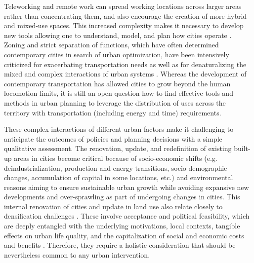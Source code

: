 Teleworking and remote work can spread working locations across larger areas rather than concentrating them, and also encourage the creation of more hybrid and mixed-use spaces. This increased complexity makes it necessary to develop new tools allowing one to understand, model, and plan how cities operate \citep{Camocini2011TeleworkingWorkplace}. Zoning and strict separation of functions, which have often determined contemporary cities in search of urban optimization, have been intensively criticized for exacerbating transportation needs as well as for denaturalizing the mixed and complex interactions of urban systems \citep{Jacobs1961}. Whereas the development of contemporary transportation has allowed cities to grow beyond the human locomotion limits, it is still an open question how to find effective tools and methods in urban planning to leverage the distribution of uses across the territory with transportation (including energy and time) requirements.

These complex interactions of different urban factors make it challenging to anticipate the outcomes of policies and planning decisions with a simple qualitative assessment. The renovation, update, and redefinition of existing built-up areas in cities become critical because of socio-economic shifts (e.g. deindustrialization, production and energy transitions, socio-demographic changes, accumulation of capital in some locations, etc.) and environmental reasons aiming to ensure sustainable urban growth while avoiding expansive new developments and over-sprawling \citep{Kahn2000TheSuburbanization,Holden2004EcologicalForm,Echenique2012GrowingSustainably} as part of undergoing changes in cities.
This internal renovation of cities and update in land use also relate closely to densification challenges \citep{Wicki2022AcceptingNeighbourhoods}. These involve acceptance and political feasibility, which are deeply entangled with the underlying motivations, local contexts, tangible effects on urban life quality, and the capitalization of social and economic costs and benefits \citep{Zografos2020TheProject}. Therefore, they require a holistic consideration  \citep{Wicki2024OffentlicheInnenverdichtung} that should be nevertheless common to any urban intervention. 

